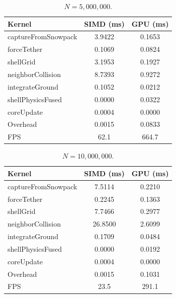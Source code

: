 \begin{table}[H]
  \caption{$N = 5{,}000{,}000$.}
  \label{tab:GTX_scaling_5m}
  \centering
  \scriptsize
  \begin{tabular}{@{}lcc@{}}
    \toprule
    \textbf{Kernel} & \textbf{SIMD (ms)} & \textbf{GPU (ms)} \\
    \midrule
    captureFromSnowpack        &  3.9422 & 0.1653 \\
    forceTether                &  0.1069 & 0.0824 \\
    shellGrid                  &  3.1953 & 0.1927 \\
    neighborCollision          &  8.7393 & 0.9272 \\
    integrateGround            &  0.1052 & 0.0212 \\
    shellPhysicsFused          &  0.0000 & 0.0322 \\
    coreUpdate                 &  0.0004 & 0.0000 \\
    Overhead                   &  0.0015 & 0.0833 \\
    \bottomrule
    FPS                        & 62.1 & 664.7 \\
  \end{tabular}
\end{table}

\begin{table}[H]
  \caption{$N = 10{,}000{,}000$.}
  \label{tab:GTX_scaling_10m}
  \centering
  \scriptsize
  \begin{tabular}{@{}lcc@{}}
    \toprule
    \textbf{Kernel} & \textbf{SIMD (ms)} & \textbf{GPU (ms)} \\
    \midrule
    captureFromSnowpack        &  7.5114 & 0.2210 \\
    forceTether                &  0.2245 & 0.1363 \\
    shellGrid                  &  7.7466 & 0.2977 \\
    neighborCollision          & 26.8500 & 2.6099 \\
    integrateGround            &  0.1709 & 0.0484 \\
    shellPhysicsFused          &  0.0000 & 0.0192 \\
    coreUpdate                 &  0.0004 & 0.0000 \\
    Overhead                   &  0.0015 & 0.1031 \\
    \bottomrule
    FPS                        & 23.5 & 291.1 \\
  \end{tabular}
\end{table}

